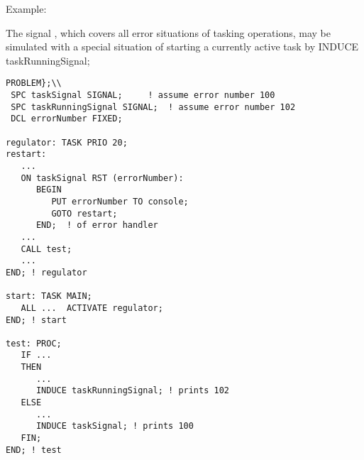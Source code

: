 


Example:

The signal , which covers all error situations of 
tasking operations, may be simulated with a special situation of 
starting a currently active task by INDUCE taskRunningSignal;


\begin{lstlisting}
PROBLEM};\\
 SPC taskSignal SIGNAL; 	! assume error number 100 
 SPC taskRunningSignal SIGNAL;	! assume error number 102
 DCL errorNumber FIXED;

regulator: TASK PRIO 20;
restart:
   ...
   ON taskSignal RST (errorNumber):
      BEGIN 
         PUT errorNumber TO console;
         GOTO restart;
      END;  ! of error handler 
   ...
   CALL test;
   ...
END; ! regulator

start: TASK MAIN;
   ALL ...  ACTIVATE regulator;
END; ! start

test: PROC;
   IF ... 
   THEN
      ...
      INDUCE taskRunningSignal; ! prints 102
   ELSE
      ...
      INDUCE taskSignal; ! prints 100
   FIN;
END; ! test
\end{lstlisting}

